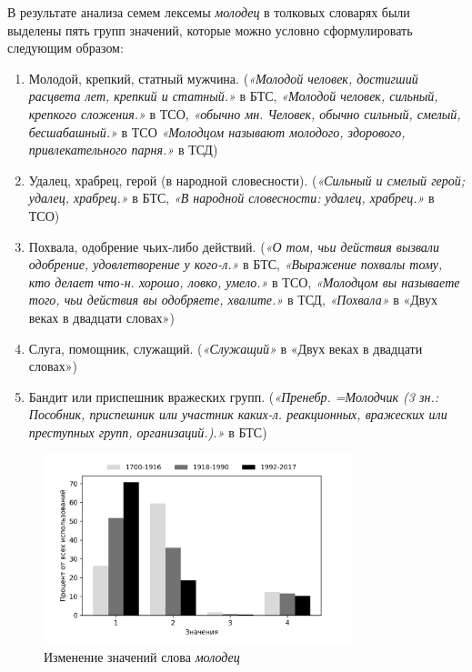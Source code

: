 В результате анализа семем лексемы \textit{молодец} в толковых словарях были выделены пять групп значений,
которые можно условно сформулировать следующим образом:

\begin{enumerate}
    \item Молодой, крепкий, статный мужчина.
    (\textit{«Молодой человек, достигший расцвета лет, крепкий и статный.»} в БТС,
    \textit{«Молодой человек, сильный, крепкого сложения.»} в ТСО,  %
    \textit{«обычно мн. Человек, обычно сильный, смелый, бесшабашный.»} в ТСО
    \textit{«Молодцом называют молодого, здорового, привлекательного парня.»} в ТСД)

    \item Удалец, храбрец, герой (в народной словесности).
    (\textit{«Сильный и смелый герой; удалец, храбрец.»} в БТС,
    \textit{«В народной словесности: удалец, храбрец.»} в ТСО)

    \item Похвала, одобрение чьих-либо действий.
    (\textit{«О том, чьи действия вызвали одобрение, удовлетворение у кого-л.»} в БТС,
    \textit{«Выражение похвалы тому, кто делает что-н. хорошо, ловко, умело.»} в ТСО,
    \textit{«Молодцом вы называете того, чьи действия вы одобряете, хвалите.»} в ТСД,
    \textit{«Похвала»} в «Двух веках в двадцати словах»)

    \item Слуга, помощник, служащий.
(\textit{«Служащий»} в «Двух веках в двадцати словах»)

    \item Бандит или приспешник вражеских групп.
(\textit{«Пренебр. =Молодчик (3 зн.: Пособник, приспешник или участник каких-л. реакционных,
вражеских или преступных групп, организаций.).»} в БТС)
\end{enumerate}


\begin{figure}[H]
	\centering
	\includegraphics[width=0.8\textwidth]{img/visualizations/molodets_minimal}
	\caption{Изменение значений слова \textit{молодец}}
	\label{fig:Молодец}
\end{figure}

